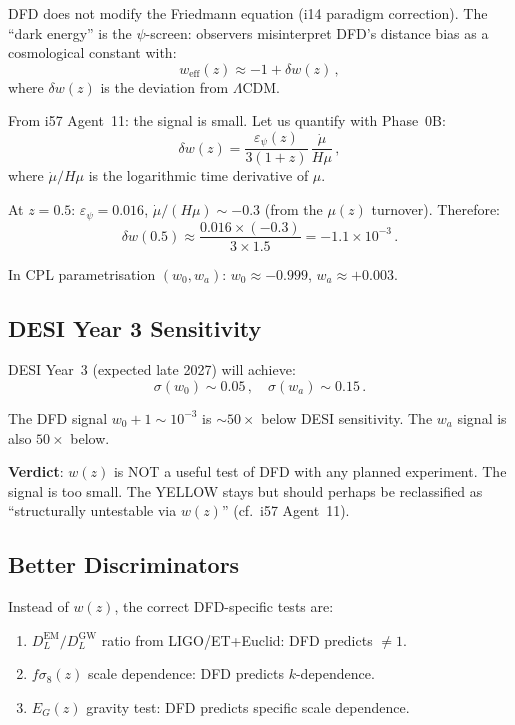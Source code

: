\documentclass[11pt,a4paper]{article}
\begin{document}
DFD does not modify the Friedmann equation (i14 paradigm correction). The ``dark energy'' is the $\psi$-screen: observers misinterpret DFD's distance bias as a cosmological constant with:
\begin{equation}
w_{\mathrm{eff}}(z) \approx -1 + \delta w(z)\,,
\end{equation}
where $\delta w(z)$ is the deviation from $\Lambda$CDM.

From i57 Agent~11: the signal is small. Let us quantify with Phase~0B:
\begin{equation}
\delta w(z) = \frac{\varepsilon_\psi(z)}{3(1 + z)}\,\frac{\dot{\mu}}{H\mu}\,,
\end{equation}
where $\dot{\mu}/H\mu$ is the logarithmic time derivative of $\mu$.

At $z = 0.5$: $\varepsilon_\psi = 0.016$, $\dot{\mu}/(H\mu) \sim -0.3$ (from the $\mu(z)$ turnover). Therefore:
\begin{equation}
\delta w(0.5) \approx \frac{0.016 \times (-0.3)}{3 \times 1.5} = -1.1 \times 10^{-3}\,.
\end{equation}

In CPL parametrisation $(w_0, w_a)$: $w_0 \approx -0.999$, $w_a \approx +0.003$.

\subsection{DESI Year 3 Sensitivity}

DESI Year~3 (expected late 2027) will achieve:
\begin{equation}
\sigma(w_0) \sim 0.05\,,\quad \sigma(w_a) \sim 0.15\,.
\end{equation}

The DFD signal $w_0 + 1 \sim 10^{-3}$ is $\sim 50\times$ below DESI sensitivity. The $w_a$ signal is also $50\times$ below.

\textbf{Verdict}: $w(z)$ is NOT a useful test of DFD with any planned experiment. The signal is too small. The YELLOW stays but should perhaps be reclassified as ``structurally untestable via $w(z)$'' (cf.~i57 Agent~11).

\subsection{Better Discriminators}

Instead of $w(z)$, the correct DFD-specific tests are:
\begin{enumerate}
\item $D_L^{\mathrm{EM}}/D_L^{\mathrm{GW}}$ ratio from LIGO/ET+Euclid: DFD predicts $\neq 1$.
\item $f\sigma_8(z)$ scale dependence: DFD predicts $k$-dependence.
\item $E_G(z)$ gravity test: DFD predicts specific scale dependence.
\end{enumerate}
\end{document}
